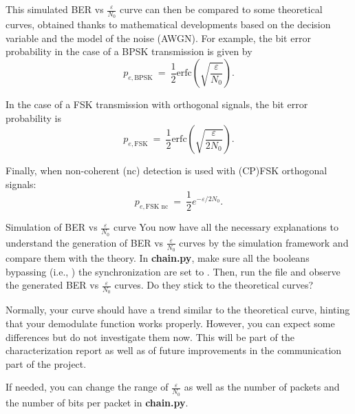 This simulated BER vs $\frac{\varepsilon}{N_0}$ curve can then be compared to some theoretical curves, obtained thanks to mathematical developments based on the decision variable and the model of the noise (AWGN). For example, the bit error probability in the case of a BPSK transmission is given by
\begin{equation*}
    p_{e,\text{BPSK}}\:=\:\frac{1}{2} \text{erfc}\left(\sqrt{\frac{\varepsilon}{N_0}}\right).
\end{equation*}

In the case of a FSK transmission with orthogonal signals, the bit error probability is
\begin{equation*}
    p_{e,\text{FSK}}\:=\:\frac{1}{2} \text{erfc}\left(\sqrt{\frac{\varepsilon}{2N_0}}\right).
\end{equation*}

Finally, when non-coherent (nc) detection is used with (CP)FSK orthogonal signals:
\begin{equation*}
    p_{e,\text{FSK nc}}\:=\:\frac{1}{2}e^{-\varepsilon/2N_0}.
\end{equation*}

\begin{bclogo}[couleur = gray!20, arrondi = 0.2, logo=\bccrayon]{Simulation of BER vs $\frac{\varepsilon}{N_0}$ curve}
You now have all the necessary explanations to understand the generation of BER vs $\frac{\varepsilon}{N_0}$ curves by the simulation framework and compare them with the theory. In \textbf{chain.py}, make sure all the booleans bypassing (i.e., ) the synchronization are set to . Then, run the file and observe the generated BER vs $\frac{\varepsilon}{N_0}$ curves. Do they stick to the theoretical curves?

Normally, your curve should have a trend similar to the theoretical curve, hinting that your demodulate function works properly. However, you can expect some differences but do not investigate them now. This will be part of the characterization report as well as of future improvements in the communication part of the project.

If needed, you can change the range of $\frac{\varepsilon}{N_0}$ as well as the number of packets and the number of bits per packet in \textbf{chain.py}.
\end{bclogo}
